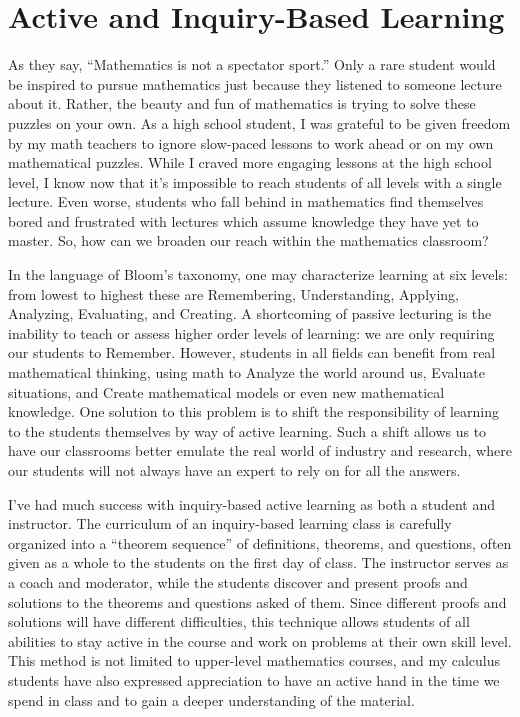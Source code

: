 \documentclass[11pt]{amsart}
\theoremstyle{plain}
\newcommand{\<}{\langle}
\renewcommand{\>}{\rangle}
\begin{document}
\section*{Active and Inquiry-Based Learning}

As they say, ``Mathematics is not a spectator sport.'' Only a rare student
would be inspired to pursue mathematics just because they listened to someone
lecture about it. Rather, the beauty and fun of mathematics is trying
to solve these puzzles on your own.
As a high school student, I was grateful to be given freedom by my math
teachers to ignore slow-paced lessons to work ahead or on my own
mathematical puzzles. While I craved more engaging lessons at the high school
level, I know now that it's impossible to reach students of all
levels with a single lecture. Even worse, students who fall behind in
mathematics find themselves bored and frustrated with lectures which assume
knowledge they have yet to master. So, how can we broaden our reach within the
mathematics classroom?

In the language of Bloom's taxonomy, one
may characterize learning at six levels: from lowest to highest these are
Remembering, Understanding, Applying, Analyzing, Evaluating, and Creating.
A shortcoming of passive lecturing is the inability to teach or assess
higher order levels of learning: we are only requiring our students to Remember.
However, students in all fields can benefit from real mathematical thinking,
using math to Analyze the world around us, Evaluate situations, and Create
mathematical models or even new mathematical knowledge.
One solution to this problem is to shift the responsibility of learning to
the students themselves by way of active learning. Such a shift allows us to
have our classrooms better emulate the real world of industry and research,
where our students will not always have an expert to rely on for all the
answers.

I've had much success with inquiry-based active learning as both a student
and instructor.
The curriculum of an inquiry-based learning class is carefully organized into
a ``theorem sequence'' of definitions, theorems, and questions, often given as
a whole to the students on the first day of class.
The instructor serves as a coach and moderator, while the students discover
and present proofs and solutions to the theorems and questions asked of them.
Since different proofs and solutions will have different difficulties, this
technique allows students of all abilities to stay active in the course and
work on problems at their own skill level. This method is not limited to
upper-level mathematics courses, and my calculus students have also expressed
appreciation to have an active hand in the time we spend in class and to gain
a deeper understanding of the material.
\end{document}
